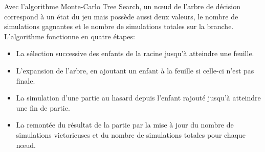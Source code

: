 \documentclass{article}
\begin{document}
\newline\newline
Avec l'algorithme Monte-Carlo Tree Search, un nœud de l'arbre de décision correspond à un état du jeu mais possède aussi deux valeurs, le nombre de simulations gagnantes et le nombre de simulations totales sur la branche.
L'algorithme fonctionne en quatre étapes\cite{MonteCarlo}:
\begin{itemize}
\item La sélection successive des enfants de la racine jusqu'à atteindre une feuille.
\item L'expansion de l'arbre, en ajoutant un enfant à la feuille si celle-ci n'est pas finale.
\item La simulation d'une partie au hasard depuis l'enfant rajouté jusqu'à atteindre une fin de partie.
\item La remontée du résultat de la partie par la mise à jour du nombre de simulations victorieuses et du nombre de simulations totales pour chaque nœud.
\end{itemize}
\newpage
\end{document}
